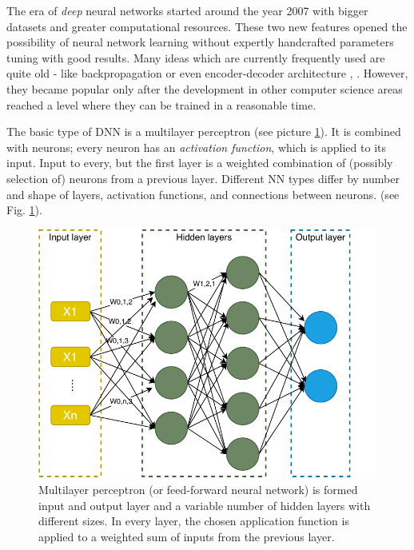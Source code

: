 The era of \textit{deep} neural networks started around the year 2007 \citep{Goodfellow-et-al-2016} with bigger datasets and greater computational resources. These two new features opened the possibility of neural network learning without expertly handcrafted parameters tuning with good results.
Many ideas which are currently frequently used are quite old - like backpropagation \citep{Rumelhart} or even encoder-decoder architecture \citep{Allen19}, \citep{Forcada1997}. However, they became popular only after the development in other computer science areas reached a level where they can be trained in a reasonable time.
\par
The basic type of DNN is a multilayer perceptron (see picture \ref{pic:multilayer}).
It is combined with neurons; every neuron has an \textit{activation function}, which is applied to its input. Input to every, but the first layer is a weighted combination of (possibly selection of) neurons from a previous layer. 
Different NN types differ by number and shape of layers, activation functions, and connections between neurons. (see Fig. \ref{pic:multilayer}).
\begin{figure}[h]
\centering
\includegraphics[width=1\columnwidth]{../img/multilayer}
\caption{Multilayer perceptron (or feed-forward neural network) is formed input and output layer and a variable number of hidden layers with different sizes. In every layer, the chosen application function is applied to a weighted sum of inputs from the previous layer.}
\label{pic:multilayer}
\end{figure}
\par
